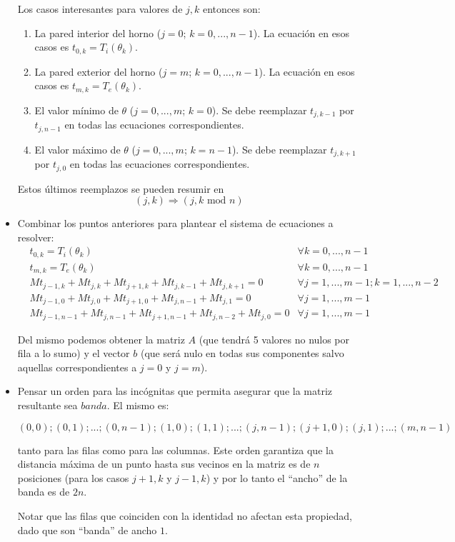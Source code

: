 \begin{itemize}
    Los casos interesantes para valores de $j, k$ entonces son:
    \begin{enumerate}
     \item La pared interior del horno ($j = 0$; $k = 0, ..., n-1$). La ecuación en esos casos es $t_{0, k} = T_i(\theta_k)$.
     \item La pared exterior del horno ($j = m$; $k = 0, ..., n-1$). La ecuación en esos casos es $t_{m, k} = T_e(\theta_k)$.
     \item El valor mínimo de $\theta$ ($j = 0, ..., m$; $k = 0$). Se debe reemplazar $t_{j, k-1}$ por $t_{j, n-1}$ en todas las ecuaciones correspondientes.
     \item El valor máximo de $\theta$ ($j = 0, ..., m$; $k = n-1$). Se debe reemplazar $t_{j, k+1}$ por $t_{j, 0}$ en todas las ecuaciones correspondientes.
    \end{enumerate}
    Estos últimos reemplazos se pueden resumir en $$(j, k) \Rightarrow (j, k \text{ mod } n)$$
 \item
    Combinar los puntos anteriores para plantear el sistema de ecuaciones a resolver:
    \begin{align*}\label{sistema}
    &t_{0, k} = T_i(\theta_k)                                           &\forall k = 0, ..., n-1  \\
    &t_{m, k} = T_e(\theta_k)                                           &\forall k = 0, ..., n-1  \\
    &Mt_{j-1,k} + Mt_{j,k} + Mt_{j+1,k} + Mt_{j,k-1} + Mt_{j,k+1} = 0  &\forall j=1, ..., m-1; k = 1, ... , n-2 \\
    &Mt_{j-1,0} + Mt_{j,0} + Mt_{j+1,0} + Mt_{j,n-1} + Mt_{j,1} = 0    &\forall j=1, ..., m-1 \\
    &Mt_{j-1,n-1} + Mt_{j,n-1} + Mt_{j+1,n-1} + Mt_{j,n-2} + Mt_{j,0} = 0    &\forall j=1, ..., m-1
    \end{align*}

    Del mismo podemos obtener la matriz $A$ (que tendrá 5 valores no nulos por fila a lo sumo) y el vector $b$ (que será nulo en todas sus componentes salvo aquellas correspondientes a $j=0$ y $j=m$).
  \item
    Pensar un orden para las incógnitas que permita asegurar que la matriz resultante sea $banda$. El mismo es:
    
    $$ (0,0); (0,1); ... ; (0,n-1); (1,0); (1,1); ... ; (j,n-1); (j+1,0); (j,1); ... ; (m, n-1)$$ %
    
    tanto para las filas como para las columnas. Este orden garantiza que la distancia máxima de un punto hasta sus vecinos en la matriz es de $n$ posiciones (para los casos $j+1, k$ y $j-1, k$) y por lo tanto el ``ancho'' de la banda es de $2n$.
    
    Notar que las filas que coinciden con la identidad no afectan esta propiedad, dado que son ``banda'' de ancho $1$.
\end{itemize}

